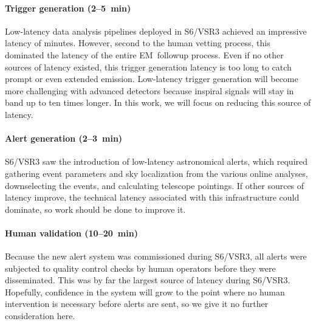 \documentclass[preprint2]{aastex}
\newcommand{\EM}{EM}%
\begin{document}
\paragraph{Trigger generation (2--5~min)}%
Low-latency data analysis pipelines
deployed in S6/VSR3 achieved an impressive latency of minutes.  However, second
to the human vetting process, this dominated the latency of the entire \EM\
followup process.  Even if no other sources of latency existed, this trigger
generation latency is too long to catch prompt or even extended emission.
Low-latency trigger generation will become more challenging with advanced
detectors because inspiral signals will stay in band up to ten times longer.  In
this work, we will focus on reducing this source of latency.

\paragraph{Alert generation (2--3~min)}%
S6/VSR3 saw the introduction of low-latency astronomical alerts, which required
gathering event parameters and sky localization from the various online
analyses, downselecting the events, and calculating telescope pointings.  If
other sources of latency improve, the technical latency associated with this
infrastructure could dominate, so work should be done to improve it.

\paragraph{Human validation (10--20~min)}%
Because the new alert system was commissioned during S6/VSR3, all alerts were
subjected to quality control checks by human operators before they were
disseminated. This was by far the largest source of latency during S6/VSR3.
Hopefully, confidence in the system will grow to the point where no human
intervention is necessary before alerts are sent, so we give it no further
consideration here.

\paragraph{}
\end{document}
